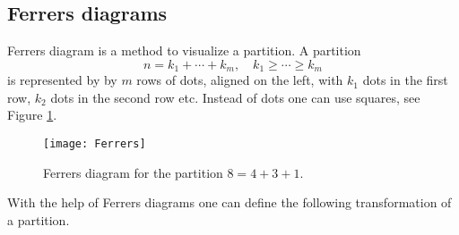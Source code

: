 \subsection{Ferrers diagrams}
Ferrers diagram is a method to visualize a partition.
A partition
\[
n = k_1 + \cdots + k_m, \quad k_1 \ge \cdots \ge k_m
\]
is represented by by $m$ rows of dots, aligned on the left, with $k_1$ dots in the first row, $k_2$ dots in the second row etc.
Instead of dots one can use squares, see Figure \ref{fig:Ferrers}.

\begin{figure}[ht]
\begin{center}
\texttt{[image: Ferrers]}
\end{center}
\caption{Ferrers diagram for the partition $8 = 4 + 3 + 1$.}
\label{fig:Ferrers}
\end{figure}

With the help of Ferrers diagrams one can define the following transformation of a partition.
